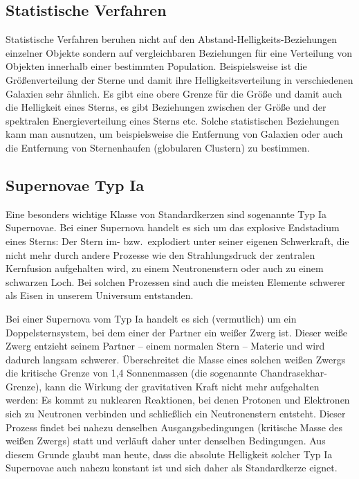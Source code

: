 \subsection{Statistische Verfahren}

Statistische Verfahren beruhen nicht auf den Abstand-Helligkeits-Beziehungen einzelner Objekte
sondern auf vergleichbaren Beziehungen f\"ur eine Verteilung von Objekten innerhalb einer bestimmten
Population. Beispielsweise ist die Gr\"o\ss enverteilung der Sterne und damit ihre Helligkeitsverteilung
in verschiedenen Galaxien sehr \"ahnlich. Es gibt eine obere Grenze f\"ur die Gr\"o\ss e und damit
auch die Helligkeit eines Sterns, es gibt Beziehungen zwischen der Gr\"o\ss e und der spektralen
Energieverteilung eines Sterns etc. Solche statistischen Beziehungen kann man ausnutzen,
um beispielsweise die Entfernung von Galaxien oder auch die Entfernung von Sternenhaufen
(globularen Clustern) zu bestimmen. 

\subsection{Supernovae Typ Ia}

Eine besonders wichtige Klasse von Standardkerzen 
sind sogenannte Typ Ia Supernovae. 
Bei einer Supernova handelt es sich um das explosive Endstadium eines Sterns: Der Stern
im- bzw.\ explodiert unter seiner eigenen Schwerkraft, die nicht mehr durch andere Prozesse
wie den Strahlungsdruck der zentralen Kernfusion aufgehalten wird, zu einem Neutronenstern oder auch zu einem 
schwarzen Loch. Bei solchen Prozessen sind auch die meisten Elemente schwerer
als Eisen in unserem Universum entstanden. 

Bei einer Supernova vom Typ Ia handelt es sich (vermutlich) um ein Doppelsternsystem, bei
dem einer der Partner ein wei\ss er Zwerg ist. Dieser wei\ss e Zwerg entzieht seinem Partner -- 
einem normalen Stern -- Materie und wird dadurch langsam schwerer. \"Uberschreitet die Masse
eines solchen wei\ss en Zwergs die kritische Grenze von 1,4 Sonnenmassen (die sogenannte
Chandrasekhar-Grenze), 
kann die Wirkung der gravitativen Kraft nicht mehr aufgehalten
werden: Es kommt zu nuklearen Reaktionen, bei denen Protonen und Elektronen sich zu
Neutronen verbinden und schlie\ss lich ein Neutronenstern entsteht. Dieser Prozess findet bei
nahezu denselben Ausgangsbedingungen (kritische Masse des wei\ss en Zwergs) statt und verl\"auft
daher unter denselben Bedingungen. Aus diesem Grunde glaubt man heute, dass die
absolute Helligkeit solcher Typ Ia Supernovae auch nahezu konstant ist und sich daher
als Standardkerze eignet. 

